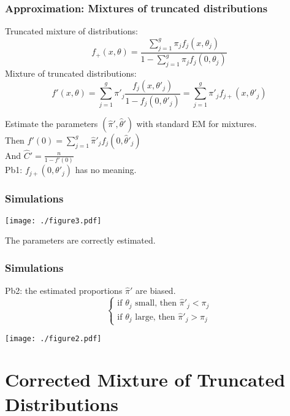 \documentclass{beamer}
\begin{document}
\begin{frame}\frametitle{Approximation: Mixtures of truncated distributions}
Truncated mixture of distributions:
\[ f_+(x,\theta) = \frac{\sum_{j=1}^g \pi_j f_j(x,\theta_j)}{1-\sum_{j=1}^g \pi_j f_j(0,\theta_j)} \]
Mixture of truncated distributions:
\[ f'(x,\theta) = \sum_{j=1}^g \pi'_j \frac{ f_j(x,\theta'_j)}{1- f_j(0,\theta'_j)} = \sum_{j=1}^g \pi'_j f_{j+}(x,\theta'_j) \]

Estimate the parameters $(\hat \pi',\hat \theta')$ with standard EM for mixtures. \\

Then $\hat f'(0) = \sum_{j=1}^g \hat \pi'_j f_j(0,\hat \theta'_j)$ \\

And $\hat C' = \frac{n}{1 - f'(0)}$ \\

Pb1: $f_{j+}(0,\theta'_j)$ has no meaning.

\end{frame}

\begin{frame}\frametitle{Simulations}

\begin{center}
 \texttt{[image: ./figure3.pdf]}
\end{center}

The parameters are correctly estimated.

\end{frame}

\begin{frame}\frametitle{Simulations}

Pb2: the estimated proportions $\hat \pi' $ are biased.
\[
 \begin{cases}
  \text{if } \theta_j \text{ small, then } \hat \pi'_j < \pi_j \\
  \text{if } \theta_j \text{ large, then } \hat \pi'_j > \pi_j 
 \end{cases}
\]

\begin{center}
 \texttt{[image: ./figure2.pdf]}
\end{center}

\end{frame}

\section[Corrected Mixture]{Corrected Mixture of Truncated Distributions}
\end{document}
